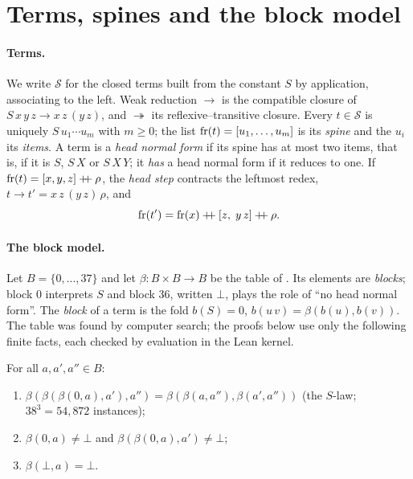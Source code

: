 \section{Terms, spines and the block model}\label{sec:prelims}

\paragraph{Terms.} We write $\mathcal S$ for the closed terms built from the constant $S$
by application, associating to the left. Weak reduction $\to$ is the compatible closure
of $S\,x\,y\,z\to x\,z\,(y\,z)$, and $\twoheadrightarrow$ its reflexive--transitive
closure. Every $t\in\mathcal S$ is uniquely $S\,u_1\cdots u_m$ with $m\ge0$; the list
$\operatorname{fr}(t)=[u_1,\dots,u_m]$ is its \emph{spine} and the $u_i$ its \emph{items}. A term is
a \emph{head normal form} if its spine has at most two items, that is, if it is $S$,
$S\,X$ or $S\,X\,Y$; it \emph{has} a head normal form if it reduces to one. If
$\operatorname{fr}(t)=[x,y,z]\mathbin{+\!\!+}\rho$, the \emph{head step} contracts the leftmost redex,
$t\to t'=x\,z\,(y\,z)\,\rho$, and
\begin{equation}\label{eq:headstep}
\operatorname{fr}(t')=\operatorname{fr}(x)\mathbin{+\!\!+}[z,\;y\,z]\mathbin{+\!\!+}\rho .
\end{equation}

\paragraph{The block model.} Let $B=\{0,\dots,37\}$ and let $\beta\colon B\times B\to B$
be the table of . Its elements are \emph{blocks}; block $0$
interprets $S$ and block $36$, written $\bot$, plays the role of ``no head normal
form''. The \emph{block} of a term is the fold $b(S)=0$, $b(u\,v)=\beta(b(u),b(v))$. The
table was found by computer search; the proofs below use only the following finite facts,
each checked by evaluation in the Lean kernel.

\begin{lemma}\label{lem:table}
For all $a,a',a''\in B$:
\begin{enumerate}
\item[(i)] $\beta(\beta(\beta(0,a),a'),a'')=\beta(\beta(a,a''),\beta(a',a''))$
  \textup{(the $S$-law; $38^3=54{,}872$ instances)};
\item[(ii)] $\beta(0,a)\ne\bot$ and $\beta(\beta(0,a),a')\ne\bot$;
\item[(iii)] $\beta(\bot,a)=\bot$.
\end{enumerate}
\end{lemma}

